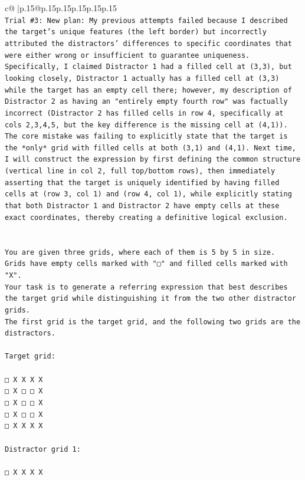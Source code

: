 \documentclass{article}
\begin{document}
{\begin{supertabular}{c@{$\;$}|p{.15\linewidth}@{}p{.15\linewidth}p{.15\linewidth}p{.15\linewidth}p{.15\linewidth}p{.15\linewidth}}
{{{\\ 
\texttt{Trial \#3: New plan: My previous attempts failed because I described the target's unique features (the left border) but incorrectly attributed the distractors' differences to specific coordinates that were either wrong or insufficient to guarantee uniqueness. Specifically, I claimed Distractor 1 had a filled cell at (3,3), but looking closely, Distractor 1 actually has a filled cell at (3,3) while the target has an empty cell there; however, my description of Distractor 2 as having an "entirely empty fourth row" was factually incorrect (Distractor 2 has filled cells in row 4, specifically at cols 2,3,4,5, but the key difference is the missing cell at (4,1)). The core mistake was failing to explicitly state that the target is the *only* grid with filled cells at both (3,1) and (4,1). Next time, I will construct the expression by first defining the common structure (vertical line in col 2, full top/bottom rows), then immediately asserting that the target is uniquely identified by having filled cells at (row 3, col 1) and (row 4, col 1), while explicitly stating that both Distractor 1 and Distractor 2 have empty cells at these exact coordinates, thereby creating a definitive logical exclusion.} \\
\\ 
\\ 
\texttt{You are given three grids, where each of them is 5 by 5 in size.} \\
\texttt{Grids have empty cells marked with "▢" and filled cells marked with "X".} \\
\texttt{Your task is to generate a referring expression that best describes the target grid while distinguishing it from the two other distractor grids.} \\
\texttt{The first grid is the target grid, and the following two grids are the distractors.} \\
\\ 
\texttt{Target grid:} \\
\\ 
\texttt{□ X X X X} \\
\texttt{□ X □ □ X} \\
\texttt{□ X □ □ X} \\
\texttt{□ X □ □ X} \\
\texttt{□ X X X X} \\
\\ 
\texttt{Distractor grid 1:} \\
\\ 
\texttt{□ X X X X} \\
}}}
\end{supertabular}}
\end{document}
